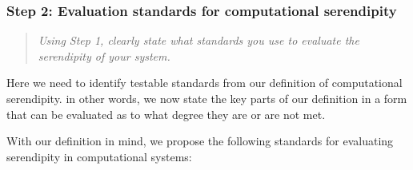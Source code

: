 \subsubsection*{Step 2: Evaluation standards for computational serendipity}
\begin{quote} {\em Using Step 1, clearly state what standards you use to evaluate the serendipity of your
    system. }\end{quote}

\noindent Here we need to identify testable standards from our definition of computational serendipity. in other words, we now state the key parts of our definition in a form that can be evaluated as to what degree they are or are not met. 

With our definition in mind, we propose the following standards for evaluating serendipity in computational systems:


